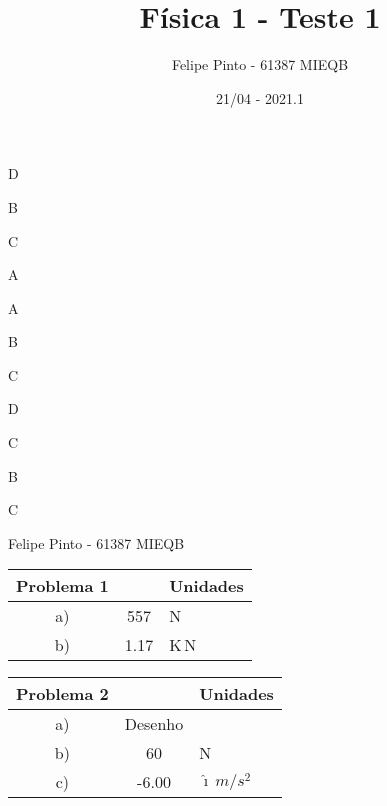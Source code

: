 \documentclass[12pt]{article}
\begin{document}
\title{\bfseries\color{DarkGreen!75!}%
	Física 1 - Teste 1%
}
\author{Felipe Pinto - 61387 MIEQB}
\date{21/04 - 2021.1}

\maketitle


\begin{enumerate}
\begin{multicols}{3}

	 \item D
	 \item B
	 \item C
	 \item A
	 \item A
	 \item B
	 \item C
	 \item D
	 \item C
	 \item B
	 \item C
	 
\end{multicols}
\end{enumerate}


\break
\noindent Felipe Pinto - 61387 MIEQB\\

\begin{tabular}{|c|c|l|}
	
	\hline
	
	Problema 1 &  & Unidades
	
	\\ \hline
	
	a) & 557 & N
	
	\\ \hline
	
	b) & 1.17 & K\,N
	
	\\ \hline

\end{tabular}

\vspace{10px}

\begin{tabular}{|c|c|l|}
	
	\hline
	
	Problema 2 &  & Unidades
	
	\\ \hline
	
	a) & Desenho &
	
	\\ \hline
	
	b) & 60 & N
	
	\\ \hline
	
	c) & -6.00 & $\hat\imath\,m/s^2$
	
	\\ \hline

\end{tabular}
\end{document}

